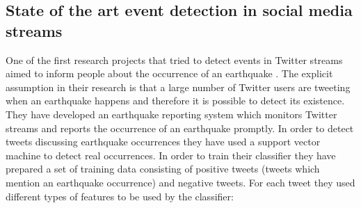 \subsection{State of the art event detection in social media streams}\label{sec:StateoftheArt}
One of the first research projects that tried to detect events in Twitter streams aimed to inform people about the occurrence of an earthquake \citep{Sakaki:2010:EST:1772690.1772777}. The explicit assumption in their research is that a large number of Twitter users are tweeting when an earthquake happens and therefore it is possible to detect its existence. They have developed an earthquake reporting system which monitors Twitter streams and reports the occurrence of an earthquake promptly.  In order to detect tweets discussing earthquake occurrences they have used a support vector machine to detect real occurrences. In order to train their classifier they have prepared a set of training data consisting of positive tweets (tweets which mention an earthquake occurrence) and negative tweets. For each tweet they used different types of features to be used by the classifier:
	 
